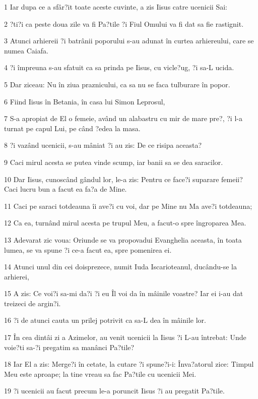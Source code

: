 \par 1 Iar dupa ce a sfâr?it toate aceste cuvinte, a zis Iisus catre ucenicii Sai:
\par 2 ?ti?i ca peste doua zile va fi Pa?tile ?i Fiul Omului va fi dat sa fie rastignit.
\par 3 Atunci arhiereii ?i batrânii poporului s-au adunat în curtea arhiereului, care se numea Caiafa.
\par 4 ?i împreuna s-au sfatuit ca sa prinda pe Iisus, cu vicle?ug, ?i sa-L ucida.
\par 5 Dar ziceau: Nu în ziua praznicului, ca sa nu se faca tulburare în popor.
\par 6 Fiind Iisus în Betania, în casa lui Simon Leprosul,
\par 7 S-a apropiat de El o femeie, având un alabastru cu mir de mare pre?, ?i l-a turnat pe capul Lui, pe când ?edea la masa.
\par 8 ?i vazând ucenicii, s-au mâniat ?i au zis: De ce risipa aceasta?
\par 9 Caci mirul acesta se putea vinde scump, iar banii sa se dea saracilor.
\par 10 Dar Iisus, cunoscând gândul lor, le-a zis: Pentru ce face?i suparare femeii? Caci lucru bun a facut ea fa?a de Mine.
\par 11 Caci pe saraci totdeauna îi ave?i cu voi, dar pe Mine nu Ma ave?i totdeauna;
\par 12 Ca ea, turnând mirul acesta pe trupul Meu, a facut-o spre îngroparea Mea.
\par 13 Adevarat zic voua: Oriunde se va propovadui Evanghelia aceasta, în toata lumea, se va spune ?i ce-a facut ea, spre pomenirea ei.
\par 14 Atunci unul din cei doisprezece, numit Iuda Iscarioteanul, ducându-se la arhierei,
\par 15 A zis: Ce voi?i sa-mi da?i ?i eu Îl voi da în mâinile voastre? Iar ei i-au dat treizeci de argin?i.
\par 16 ?i de atunci cauta un prilej potrivit ca sa-L dea în mâinile lor.
\par 17 În cea dintâi zi a Azimelor, au venit ucenicii la Iisus ?i L-au întrebat: Unde voie?ti sa-?i pregatim sa manânci Pa?tile?
\par 18 Iar El a zis: Merge?i în cetate, la cutare ?i spune?i-i: Înva?atorul zice: Timpul Meu este aproape; la tine vreau sa fac Pa?tile cu ucenicii Mei.
\par 19 ?i ucenicii au facut precum le-a poruncit Iisus ?i au pregatit Pa?tile.
